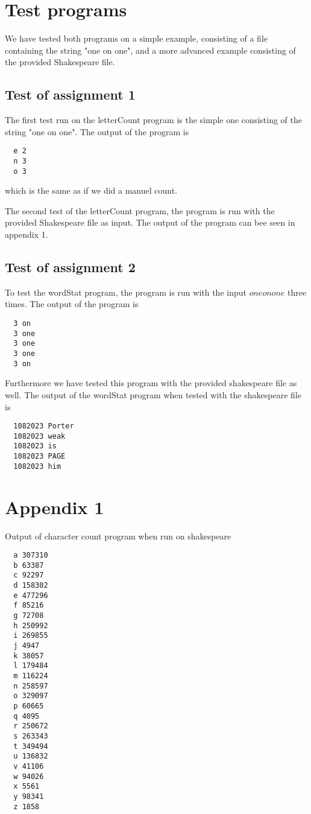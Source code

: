 \documentclass[10pt, a4paper]{article}
\begin{document}
\section{Test programs}
We have tested both programs on a simple example, consisting of a file containing the string "one on one", and a more advanced example consisting of the provided Shakespeare file.

\subsection{Test of assignment 1} %
\label{sub:assignment_1}
The first test run on the letterCount program is the simple one consisting of the string "one on one". The output of the program is
\begin{verbatim}
  e	2
  n	3
  o	3
\end{verbatim}
which is the same as if we did a manuel count.

The second test of the letterCount program, the program is run with the provided Shakespeare file as input. The output of the program can bee seen in appendix 1.

\subsection{Test of assignment 2} %
\label{sub:assignment_2}

To test the wordStat program, the program is run with the input $one on one$ three times. The output of the program is

\begin{verbatim}  
  3 on
  3 one
  3 one
  3 one    
  3 on  
\end{verbatim}

Furthermore we have tested this program with the provided shakespeare file as well. The output of the wordStat program when tested with the shakespeare file is

\begin{verbatim}
  1082023 Porter
  1082023 weak
  1082023 is
  1082023 PAGE
  1082023 him
\end{verbatim}


\newpage
\section*{Appendix 1} %
\label{sec:appendix_1}
Output of character count program when run on shakespeare
\begin{verbatim}
  a	307310
  b	63387
  c	92297
  d	158302
  e	477296
  f	85216
  g	72708
  h	250992
  i	269855
  j	4947
  k	38057
  l	179484
  m	116224
  n	258597
  o	329097
  p	60665
  q	4095
  r	250672
  s	263343
  t	349494
  u	136832
  v	41106
  w	94026
  x	5561
  y	98341
  z	1858
\end{verbatim}
\end{document}
